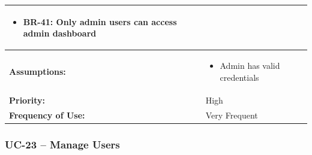 \documentclass[12pt,a4paper]{article}
\begin{document}
\begin{longtable}{|p{4.5cm}|p{10.5cm}|}
\begin{itemize}
  \item BR-41: Only admin users can access admin dashboard
\end{itemize} \\
\hline
\textbf{Assumptions:} &
\begin{itemize}
  \item Admin has valid credentials
\end{itemize} \\
\hline
\textbf{Priority:} & High \\
\hline
\textbf{Frequency of Use:} & Very Frequent \\
\hline
\end{longtable}

\subsubsection{UC-23 – Manage Users}
\end{document}
